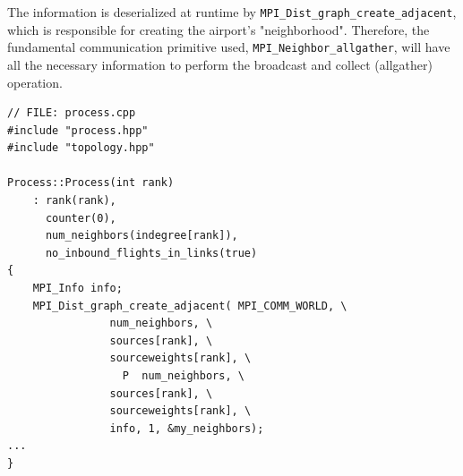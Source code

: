 \documentclass[11pt]{article}
\begin{document}
The information is deserialized at runtime by \texttt{MPI\_Dist\_graph\_create\_adjacent}, 
which is responsible for creating the airport's "neighborhood".
Therefore, the fundamental communication primitive used, \texttt{MPI\_Neighbor\_allgather}, 
will have all the necessary information to perform the broadcast and collect (allgather) operation.
\begin{verbatim}
// FILE: process.cpp
#include "process.hpp"
#include "topology.hpp"

Process::Process(int rank)
    : rank(rank),
      counter(0),
      num_neighbors(indegree[rank]),
      no_inbound_flights_in_links(true)
{
    MPI_Info info;
    MPI_Dist_graph_create_adjacent( MPI_COMM_WORLD, \
				num_neighbors, \
				sources[rank], \
				sourceweights[rank], \
			      P  num_neighbors, \
				sources[rank], \
				sourceweights[rank], \
				info, 1, &my_neighbors);
...
}
\end{verbatim}
\end{document}

